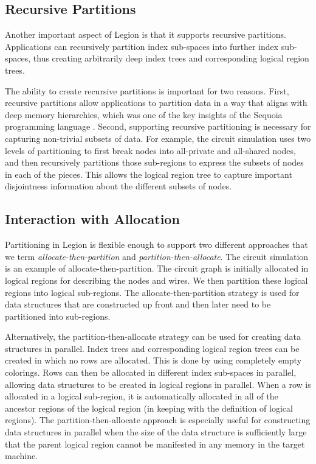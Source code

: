\subsection{Recursive Partitions}
\label{subsec:recursivepart}
Another important aspect of Legion is that it
supports recursive partitions. Applications can
recursively partition index sub-spaces into further
index sub-spaces, thus creating arbitrarily deep
index trees and corresponding logical region trees.

The ability to create recursive partitions is 
important for two reasons. First, recursive partitions
allow applications to partition data in a way that
aligns with deep memory hierarchies, which was
one of the key insights of the Sequoia programming
language \cite{Sequoia06}. Second, supporting 
recursive partitioning is necessary for capturing
non-trivial subsets of data. For example, the circuit
simulation uses two levels of partitioning to first
break nodes into all-private and all-shared nodes, and 
then recursively partitions those sub-regions to express
the subsets of nodes in each of the pieces. This 
allows the logical region tree to capture important
disjointness information about the different subsets
of nodes.

\subsection{Interaction with Allocation}
\label{subsec:partalloc}
Partitioning in Legion is flexible enough to support
two different approaches that we term
{\em allocate-then-partition} and {\em partition-then-allocate}.
The circuit simulation is an example of allocate-then-partition.
The circuit graph is initially allocated in logical regions for
describing the nodes and wires. We then partition these logical
regions into logical sub-regions. The allocate-then-partition 
strategy is used for data structures that are constructed up 
front and then later need to be partitioned into sub-regions.

Alternatively, the partition-then-allocate strategy can be
used for creating data structures in parallel. Index trees
and corresponding logical region trees can be created in
which no rows are allocated.  This is done by using completely
empty colorings.  Rows can then be allocated in different index
sub-spaces in parallel, allowing data structures to be created
in logical regions in parallel. When a row is allocated in a
logical sub-region, it is automatically allocated in all of
the ancestor regions of the logical region (in keeping with
the definition of logical regions).  The partition-then-allocate
approach is especially useful for constructing data structures
in parallel when the size of the data structure is sufficiently
large that the parent logical region cannot be manifested
in any memory in the target machine.


